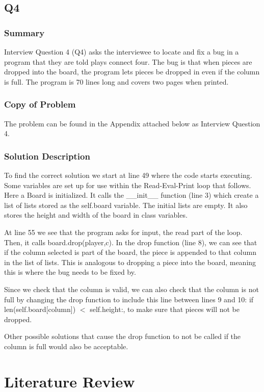 \documentclass{article}
\begin{document}
\subsection{Q4}
\subsubsection{Summary}
Interview Question 4 (Q4) asks the interviewee to locate and fix a bug in a program that they are told plays connect four.
The bug is that when pieces are dropped into the board, the program lets pieces be dropped in even if the column is full.
The program is 70 lines long and covers two pages when printed.
\subsubsection{Copy of Problem}
The problem can be found in the Appendix attached below as Interview Question 4.

\subsubsection{Solution Description}
To find the correct solution we start at line 49 where the code starts executing.
Some variables are set up for use within the Read-Eval-Print loop that follows.
Here a Board is initialized.
It calls the \_\_init\_\_ function (line 3) which create a list of lists stored as the self.board variable.
The initial lists are empty.
It also stores the height and width of the board in class variables. 

At line 55 we see that the program asks for input, the read part of the loop.
Then, it calls board.drop(player,c).
In the drop function (line 8), we can see that if the column selected is part of the board,
	the piece is appended to that column in the list of lists.
This is analogous to dropping a piece into the board, meaning this is where the bug needs to be fixed by.

Since we check that the column is valid,
	we can also check that the column is not full by changing the drop function to include this line between lines 9 and 10:
if len(self.board[column]) $<$ self.height:, to make sure that pieces will not be dropped.

Other possible solutions that cause the drop function to not be called if the column is full would also be acceptable.

\newpage
\section{Literature Review}
\end{document}

